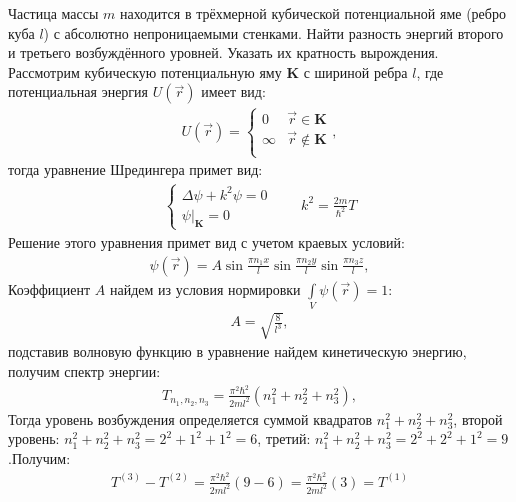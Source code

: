 \documentclass[__main__.tex]{subfiles}
\begin{document}
Частица массы $m$ находится в трёхмерной кубической потенциальной яме (ребро куба $l$) с абсолютно непроницаемыми стенками. Найти разность энергий второго и третьего возбуждённого уровней. Указать их кратность вырождения.\\

Рассмотрим кубическую потенциальную яму $\mathbf{K}$ с шириной ребра $l$, где потенциальная энергия $U(\vec{r})$ имеет вид:
\begin{gather*}
    U(\vec{r})
    =
    \begin{cases}
        0      & \vec{r}\in\mathbf{K}     \\
        \infty & \vec{r}\not\in\mathbf{K} \\
    \end{cases},
\end{gather*}
тогда уравнение Шредингера примет вид:
\begin{gather*}
\begin{cases}
\Delta\psi+k^2\psi=0\\
\left.\psi\right|_\mathbf{K}=0
\end{cases}
\qquad
k^2=\frac{2m}{\hbar^2}T
\end{gather*}
Решение этого уравнения примет вид с учетом краевых условий:
\begin{gather*}
\psi(\vec{r})
=
A\sin\frac{\pi{n_1}x}{l}\sin\frac{\pi{n_2}y}{l}\sin\frac{\pi{n_3}z}{l}, 
\end{gather*}
Коэффициент $A$ найдем из условия нормировки $\int\limits_{V}\psi(\vec{r})=1$:
\begin{gather*}
A=\sqrt{\frac{8}{l^3}},
\end{gather*}
подставив волновую функцию в уравнение найдем кинетическую энергию, получим спектр энергии:
\begin{gather*}
T_{n_1,n_2,n_3}=\frac{\pi^2\hbar^2}{2ml^2}\left(n_1^2+n_2^2+n_3^2\right),
\end{gather*} 
Тогда уровень возбуждения определяется суммой квадратов $n_1^2+n_2^2+n_3^2$, второй уровень: $n_1^2+n_2^2+n_3^2=2^2+1^2+1^2=6$, третий: $n_1^2+n_2^2+n_3^2=2^2+2^2+1^2=9$.Получим:
\begin{gather*}
T^{(3)}-T^{(2)}
=
\frac{\pi^2\hbar^2}{2ml^2}(9-6)
=
\frac{\pi^2\hbar^2}{2ml^2}(3)
=
T^{(1)}
\end{gather*} 
\end{document}
